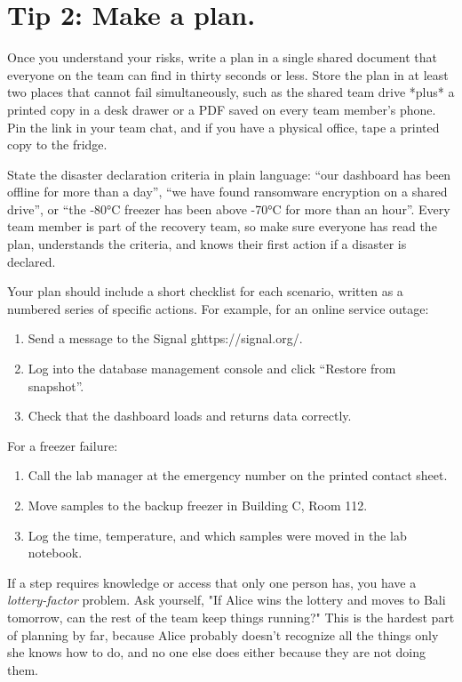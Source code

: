 \documentclass[10pt,letterpaper]{article}
\begin{document}
\section*{Tip 2: Make a plan.}

Once you understand your risks, write a plan in a single shared document
that everyone on the team can find in thirty seconds or less. Store the
plan in at least two places that cannot fail simultaneously, such as the
shared team drive *plus* a printed copy in a desk drawer or a PDF saved on
every team member's phone. Pin the link in your team chat, and if you have
a physical office, tape a printed copy to the fridge.

State the disaster declaration criteria in plain language: ``our dashboard
has been offline for more than a day'', ``we have found ransomware encryption
on a shared drive'', or ``the -80°C freezer has been above -70°C for more
than an hour''. Every team member is part of the recovery team, so make sure
everyone has read the plan, understands the criteria, and knows their first
action if a disaster is declared.

Your plan should include a short checklist for each scenario, written as a
numbered series of specific actions. For example, for an online service outage:

\begin{enumerate}
\item Send a message to the Signal ghttps://signal.org/.
\item Log into the database management console and click ``Restore from snapshot''.
\item Check that the dashboard loads and returns data correctly.
\end{enumerate}

For a freezer failure:

\begin{enumerate}
\item Call the lab manager at the emergency number on the printed contact sheet.
\item Move samples to the backup freezer in Building C, Room 112.
\item Log the time, temperature, and which samples were moved in the lab notebook.
\end{enumerate}

\begin{notebox}

If a step requires knowledge or access that only one person has, you have a
\emph{lottery-factor} problem. Ask yourself, "If Alice wins the lottery and moves
to Bali tomorrow, can the rest of the team keep things running?"  This is the
hardest part of planning by far, because Alice probably doesn't recognize all
the things only she knows how to do, and no one else does either because they
are not doing them.

\end{notebox}
\end{document}
